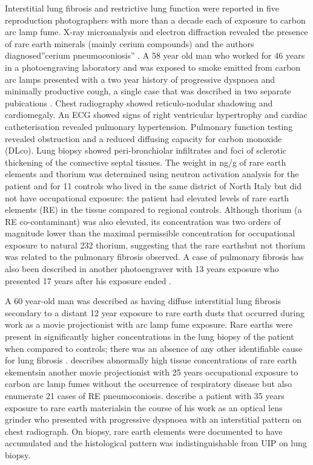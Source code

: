 \documentclass[a4
er,12pt]{article}
\begin{document}
Interstitial lung fibrosis and restrictive lung function were reported in five reproduction photographers with more than a decade each of exposure to carbon arc lamp fume. X-ray microanalysis and electron diffraction revealed the presence of rare earth minerals (mainly cerium compounds) and the authors diagnosed”cerium pneumoconiosis” \cite{Vogt1986}. A 58 year old man who worked for 46 years in a photoengraving laboratory and was exposed to smoke emitted from carbon arc lamps presented with a two year history of progressive dyspnoea and minimally productive cough, a single case that was described in two separate pubications \cite{Vocaturo1983, Sabbioni1982}. Chest radiography showed reticulo-nodular shadowing and cardiomegaly. An ECG showed signs of right ventricular hypertrophy and cardiac catheterisation revealed pulmonary hypertension. Pulmonary function testing revealed obstruction and a reduced diffusing capacity for carbon monoxide (DLco). Lung biopsy showed peri-bronchiolar infiltrates and foci of sclerotic thickening of the connective septal tissues. The weight in ng/g of rare earth elements and thorium was determined using neutron activation analysis for the patient and for 11 controls who lived in the same district of North Italy but did not have occupational exposure: the patient had elevated levels of rare earth elements (RE) in the tissue compared to regional controls. Although thorium (a RE co-contaminant) was also elevated, its concentration was two orders of magnitude lower than the maximal permissible concentration for occupational exposure to natural 232 thorium, suggesting that the rare earthsbut not thorium was related to the pulmonary fibrosis observed. A case of pulmonary fibrosis has also been described in another photoengraver with 13 years exposure who presented 17 years after his exposure ended \cite{Sulotto1986}.

A 60 year-old man was described as having diffuse interstitial lung fibrosis secondary to a distant 12 year exposure to rare earth  dusts that occurred during work as a movie projectionist with arc lamp fume exposure. Rare earths were present in significantly higher concentrations in the lung biopsy of the patient when compared to controls; there was an absence of any other identifiable cause for lung fibrosis \cite{Porru2001}. \cite{Waring1990} describes abnormally high tissue concentrations of rare earth ekementsin another movie projectionist with 25 years occupational exposure to carbon arc lamp fumes without the occurrence of respiratory disease but also enumerate 21 cases of RE pneumoconiosis. \cite{McDonald1995} describe a patient with 35 years exposure to rare earth materialsin the course of his work as an optical lens grinder who presented with progressive dyspnoea with an interstitial pattern on chest radiograph. On biopsy, rare earth elements were documented to have accumulated and the histological pattern was indistinguishable from UIP on lung biopsy.
\end{document}

